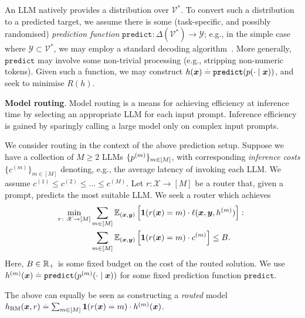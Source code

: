 An LLM natively provides a distribution over $\mathscr{V}^*$.
To
convert
such a distribution to a predicted target,
we assume there is some (task-specific, and possibly randomised) \emph{prediction function} $\texttt{predict} \colon \Delta( \mathscr{V}^* ) \to \mathscr{Y}$;
e.g., in the simple case where $\mathscr{Y} \subset \mathscr{V}^*$, 
we may employ a standard decoding 
algorithm~\citep{Ficler:2017,Fan:2018,Holtzman:2020}.
More generally, $\texttt{predict}$ may involve some non-trivial processing 
(e.g., stripping non-numeric tokens).
Given such a function, we may construct
$h( \boldsymbol{x} ) \stackrel{.}{=} \texttt{predict}( p( \cdot \mid \boldsymbol{x} ) )$,
and seek to minimise $R( h )$.




\textbf{Model routing}.
Model routing is a means for achieving efficiency at inference time
by selecting an appropriate LLM 
for each input prompt. 
Inference efficiency is gained by sparingly calling a large
model only on complex input prompts.



We consider routing in the context of the above prediction setup.
Suppose we have a collection 
of $M \geq 2$ LLMs
$\{ p^{(m)} \}_{m \in [M]}$,
with corresponding \emph{inference costs}
$\{ c^{(m)} \}_{m \in [M]}$
denoting,
e.g.,
the average latency of invoking each LLM.
We assume $c^{(1)} \leq c^{(2)} \leq \ldots \leq c^{(M)}$.
Let $r \colon \mathscr{X} \to [ M ]$ be a router that,
given a prompt, predicts the most suitable LLM.
We seek a router which achieves
\begin{align}
    \nonumber
    \min_{r \colon \mathscr{X} \to [ M ]} 
    &\sum_{m \in [ M ]} \mathbb{E}_{( \boldsymbol{x}, \boldsymbol{y} )}\left[ \bm{1}( r( \boldsymbol{x} ) = m ) \cdot \ell( \boldsymbol{x}, \boldsymbol{y}, h^{(m)}) \right] \colon \\
    \label{eqn:static-router}
    &\sum_{m \in [ M ]} \mathbb{E}_{( \boldsymbol{x}, \boldsymbol{y} )}\left[ \bm{1}( r( \boldsymbol{x} ) = m ) \cdot c^{(m)} \right] \leq B.
\end{align}
Here, $B \in \mathbb{R}_+$ is some fixed budget on the cost of the routed solution.
We use $h^{(m)}( \boldsymbol{x} ) \stackrel{.}{=} \texttt{predict}( p^{(m)}( \cdot \mid \boldsymbol{x} ) )$ for some fixed prediction function $\texttt{predict}$.

The above can equally be seen as constructing a \emph{routed} model $h_{\rm RM}( \boldsymbol{x}, r ) \stackrel{.}{=} \sum_{m \in [ M ]} \bm{1}( r( \boldsymbol{x} ) = m ) \cdot h^{(m)}( \boldsymbol{x} )$.



